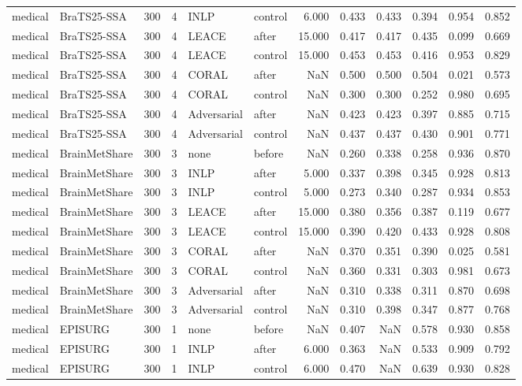 \begin{tabular}{llrrllrrrrrr}
medical & BraTS25-SSA & 300 & 4 & INLP & control & 6.000 & 0.433 & 0.433 & 0.394 & 0.954 & 0.852 \\
medical & BraTS25-SSA & 300 & 4 & LEACE & after & 15.000 & 0.417 & 0.417 & 0.435 & 0.099 & 0.669 \\
medical & BraTS25-SSA & 300 & 4 & LEACE & control & 15.000 & 0.453 & 0.453 & 0.416 & 0.953 & 0.829 \\
medical & BraTS25-SSA & 300 & 4 & CORAL & after & NaN & 0.500 & 0.500 & 0.504 & 0.021 & 0.573 \\
medical & BraTS25-SSA & 300 & 4 & CORAL & control & NaN & 0.300 & 0.300 & 0.252 & 0.980 & 0.695 \\
medical & BraTS25-SSA & 300 & 4 & Adversarial & after & NaN & 0.423 & 0.423 & 0.397 & 0.885 & 0.715 \\
medical & BraTS25-SSA & 300 & 4 & Adversarial & control & NaN & 0.437 & 0.437 & 0.430 & 0.901 & 0.771 \\
medical & BrainMetShare & 300 & 3 & none & before & NaN & 0.260 & 0.338 & 0.258 & 0.936 & 0.870 \\
medical & BrainMetShare & 300 & 3 & INLP & after & 5.000 & 0.337 & 0.398 & 0.345 & 0.928 & 0.813 \\
medical & BrainMetShare & 300 & 3 & INLP & control & 5.000 & 0.273 & 0.340 & 0.287 & 0.934 & 0.853 \\
medical & BrainMetShare & 300 & 3 & LEACE & after & 15.000 & 0.380 & 0.356 & 0.387 & 0.119 & 0.677 \\
medical & BrainMetShare & 300 & 3 & LEACE & control & 15.000 & 0.390 & 0.420 & 0.433 & 0.928 & 0.808 \\
medical & BrainMetShare & 300 & 3 & CORAL & after & NaN & 0.370 & 0.351 & 0.390 & 0.025 & 0.581 \\
medical & BrainMetShare & 300 & 3 & CORAL & control & NaN & 0.360 & 0.331 & 0.303 & 0.981 & 0.673 \\
medical & BrainMetShare & 300 & 3 & Adversarial & after & NaN & 0.310 & 0.338 & 0.311 & 0.870 & 0.698 \\
medical & BrainMetShare & 300 & 3 & Adversarial & control & NaN & 0.310 & 0.398 & 0.347 & 0.877 & 0.768 \\
medical & EPISURG & 300 & 1 & none & before & NaN & 0.407 & NaN & 0.578 & 0.930 & 0.858 \\
medical & EPISURG & 300 & 1 & INLP & after & 6.000 & 0.363 & NaN & 0.533 & 0.909 & 0.792 \\
medical & EPISURG & 300 & 1 & INLP & control & 6.000 & 0.470 & NaN & 0.639 & 0.930 & 0.828 \\

\end{tabular}
